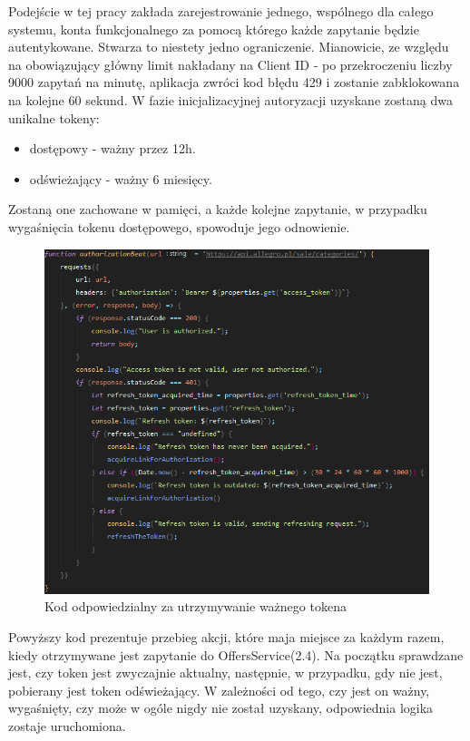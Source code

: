 Podejście w tej pracy zakłada zarejestrowanie jednego, wspólnego dla całego systemu, konta funkcjonalnego za pomocą którego każde zapytanie będzie autentykowane. Stwarza to niestety jedno ograniczenie. Mianowicie, ze względu na obowiązujący główny limit nakładany na Client ID  - po przekroczeniu liczby 9000 zapytań na minutę, aplikacja zwróci kod błędu 429 i zostanie zabklokowana na kolejne 60 sekund.
W fazie inicjalizacyjnej autoryzacji uzyskane zostaną dwa unikalne tokeny: 
\begin{itemize}
	\item dostępowy - ważny przez 12h.
	\item odświeżający - ważny 6 miesięcy.
\end{itemize}
Zostaną one zachowane w pamięci, a każde kolejne zapytanie, w przypadku wygaśnięcia tokenu dostępowego, spowoduje jego odnowienie.
\begin{figure}[H]
	\centering
	\includegraphics[width=\linewidth]{authorization.png}
	\caption{Kod odpowiedzialny za utrzymywanie ważnego tokena}
\end{figure}
Powyższy kod prezentuje przebieg akcji, które maja miejsce za każdym razem, kiedy otrzymywane jest zapytanie do OffersService(2.4). Na początku sprawdzane jest, czy token jest zwyczajnie aktualny, następnie, w przypadku, gdy nie jest, pobierany jest token odświeżający. W zależności od tego, czy jest on ważny, wygaśnięty, czy może w ogóle nigdy nie został uzyskany, odpowiednia logika zostaje uruchomiona.

